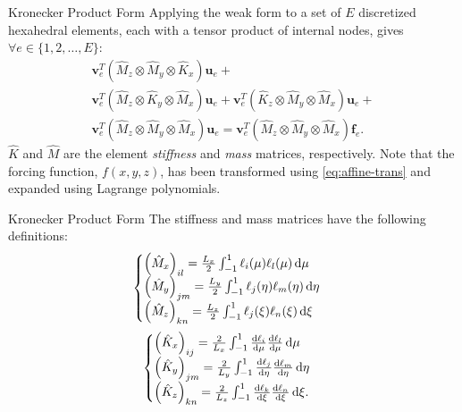 \begin{frame}{Kronecker Product Form}
  Applying the weak form to a set of $E$ discretized hexahedral elements, each with a tensor product of internal nodes, gives $\forall e\in \{1,2,\dots ,E\}$:
  \begin{multline}
    \label{eq:kronecker-product-form}
    \mathbf{v}^T_e\left(\hat{M}_z\otimes \hat{M}_y\otimes \hat{K}_x\right)\mathbf{u}_e+\\
    \mathbf{v}^T_e\left(\hat{M}_z\otimes \hat{K}_y\otimes \hat{M}_x\right)\mathbf{u}_e+
    \mathbf{v}^T_e\left(\hat{K}_z\otimes \hat{M}_y\otimes \hat{M}_x\right)\mathbf{u}_e+\\
    \mathbf{v}^T_e\left(\hat{M}_z\otimes\hat{M}_y\otimes\hat{M}_x\right)\mathbf{u}_e=
    \mathbf{v}^T_e\left(\hat{M}_z\otimes\hat{M}_y\otimes\hat{M}_x\right)\mathbf{f}_e.
  \end{multline}
  $\hat{K}$ and $\hat{M}$ are the element \textit{stiffness} and \textit{mass} matrices, respectively.
  Note that the forcing function, $f(x,y,z)$, has been transformed using \cref{eq:affine-trans} and expanded using Lagrange polynomials.
\end{frame}

\begin{frame}{Kronecker Product Form}
  The stiffness and mass matrices have the following definitions:
  \begin{equation}
    \label{eq:mass-matrices}
    \begin{cases}
      \left(\hat{M}_x\right)_{il}=\frac{L_x}{2}\int_{-1}^{1}\ell_i(\mu)\ell_l(\mu)\odif{\mu}      \\
      \left({\hat{M}_y}\right)_{jm}=\frac{L_y}{2}\int_{-1}^{1}\ell_j(\eta)\ell_m(\eta)\odif{\eta} \\
      \left({\hat{M}_z}\right)_{kn}=\frac{L_z}{2}\int_{-1}^{1}\ell_j(\xi)\ell_n(\xi)\odif{\xi}
    \end{cases}
  \end{equation}
  \begin{equation}
    \label{eq:stiffness-matrics}
    \begin{cases}
      \left(\hat{K}_{x}\right)_{ij}=\frac{2}{L_x}\int_{-1}^{1}\odv{\ell_i}{\mu}\odv{\ell_l}{\mu}\odif{\mu}    \\
      \left(\hat{K}_{y}\right)_{jm}=\frac{2}{L_y}\int_{-1}^{1}\odv{\ell_j}{\eta}\odv{\ell_m}{\eta}\odif{\eta} \\
      \left(\hat{K}_{z}\right)_{kn}=\frac{2}{L_z}\int_{-1}^{1}\odv{\ell_k}{\xi}\odv{\ell_n}{\xi}\odif{\xi}.
    \end{cases}
  \end{equation}
\end{frame}
